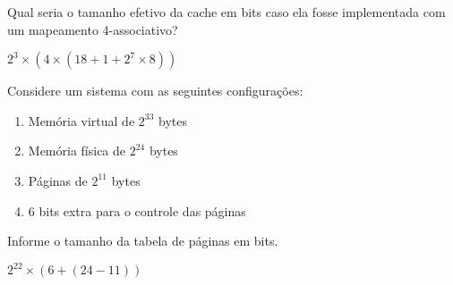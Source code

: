 \documentclass{article}
\begin{document}
Qual seria o tamanho efetivo da cache em bits caso ela fosse implementada com 
um mapeamento 4-associativo?

$2^{3}\times(4\times(18+1+2^{7}\times8))$

Considere um sistema com as seguintes configurações:

\begin{enumerate}
\item Memória virtual de $2^33$ bytes
\item Memória física de $2^24$ bytes
\item Páginas de $2^11$ bytes
\item 6 bits extra para o controle das páginas
\end{enumerate}

Informe o tamanho da tabela de páginas em bits.

$2^{22}\times(6+(24-11))$
\end{document}
